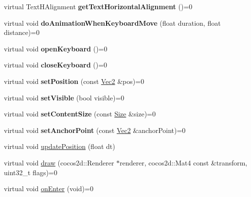 \begin{DoxyCompactItemize}
virtual Text\+H\+Alignment {\bfseries get\+Text\+Horizontal\+Alignment} ()=0
\item 
\mbox{\label{classcocos2d_1_1ui_1_1EditBoxImpl_a58ac88d8d8bdfd18d8cd39d452b31530}} 
virtual void {\bfseries do\+Animation\+When\+Keyboard\+Move} (float duration, float distance)=0
\item 
\mbox{\label{classcocos2d_1_1ui_1_1EditBoxImpl_a42acfa5bb050f8559c46ca2299ba7231}} 
virtual void {\bfseries open\+Keyboard} ()=0
\item 
\mbox{\label{classcocos2d_1_1ui_1_1EditBoxImpl_a65d1e72ced3fc3934b64eaa9df577fdc}} 
virtual void {\bfseries close\+Keyboard} ()=0
\item 
\mbox{\label{classcocos2d_1_1ui_1_1EditBoxImpl_ae59460980a1f9e4adffaecb1b288c37f}} 
virtual void {\bfseries set\+Position} (const \hyperlink{classVec2}{Vec2} \&pos)=0
\item 
\mbox{\label{classcocos2d_1_1ui_1_1EditBoxImpl_a5871253fefc6807290f0fa545ab6220d}} 
virtual void {\bfseries set\+Visible} (bool visible)=0
\item 
\mbox{\label{classcocos2d_1_1ui_1_1EditBoxImpl_a247dd5f0022c937487b5191335090a90}} 
virtual void {\bfseries set\+Content\+Size} (const \hyperlink{classSize}{Size} \&size)=0
\item 
\mbox{\label{classcocos2d_1_1ui_1_1EditBoxImpl_a03039c4d52261006310386b0095c8aba}} 
virtual void {\bfseries set\+Anchor\+Point} (const \hyperlink{classVec2}{Vec2} \&anchor\+Point)=0
\item 
virtual void \hyperlink{classcocos2d_1_1ui_1_1EditBoxImpl_a3ec4de1b40e67defdccbdec284838762}{update\+Position} (float dt)
\item 
virtual void \hyperlink{classcocos2d_1_1ui_1_1EditBoxImpl_ada62d5295e06cf1be160490b89e8ac67}{draw} (cocos2d\+::\+Renderer $\ast$renderer, cocos2d\+::\+Mat4 const \&transform, uint32\+\_\+t flags)=0
\item 
virtual void \hyperlink{classcocos2d_1_1ui_1_1EditBoxImpl_a8f9cda6f24211a5fcbcb540c256ef6e6}{on\+Enter} (void)=0

\end{DoxyCompactItemize}
